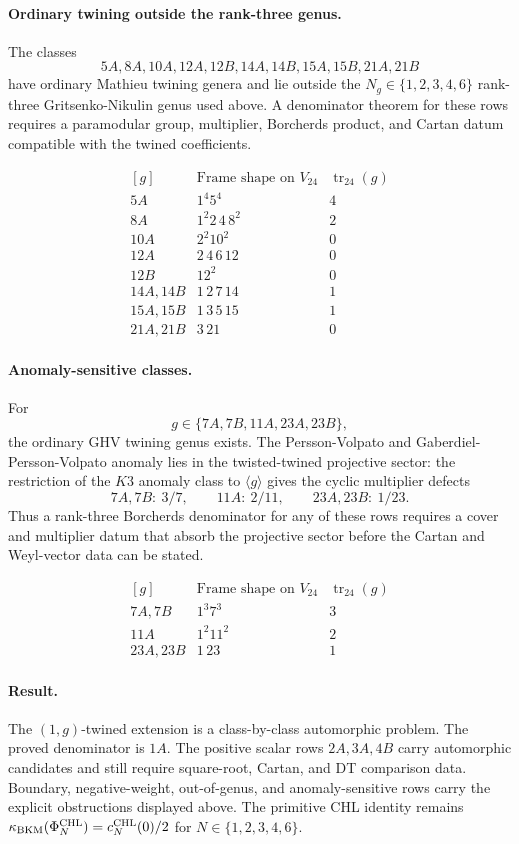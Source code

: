 \paragraph{Ordinary twining outside the rank-three genus.}
The classes
\[
  5A,8A,10A,12A,12B,14A,14B,15A,15B,21A,21B
\]
have ordinary Mathieu twining genera and lie outside the
\(N_g\in\{1,2,3,4,6\}\) rank-three Gritsenko-Nikulin genus used above.
A denominator theorem for these rows requires a paramodular group,
multiplier, Borcherds product, and Cartan datum compatible with the
twined coefficients.

\[
\begin{array}{c|c|c}
[g] & \text{Frame shape on }V_{24} & \operatorname{tr}_{24}(g)\\ \hline
5A & 1^4 5^4 & 4\\
8A & 1^2 2\,4\,8^2 & 2\\
10A & 2^2 10^2 & 0\\
12A & 2\,4\,6\,12 & 0\\
12B & 12^2 & 0\\
14A,14B & 1\,2\,7\,14 & 1\\
15A,15B & 1\,3\,5\,15 & 1\\
21A,21B & 3\,21 & 0
\end{array}
\]

\paragraph{Anomaly-sensitive classes.}
For
\[
  g\in\{7A,7B,11A,23A,23B\},
\]
the ordinary GHV twining genus exists.  The Persson-Volpato and
Gaberdiel-Persson-Volpato anomaly lies in the twisted-twined
projective sector: the restriction of the \(K3\) anomaly class to
\(\langle g\rangle\) gives the cyclic multiplier defects
\[
  7A,7B:\ 3/7,\qquad
  11A:\ 2/11,\qquad
  23A,23B:\ 1/23.
\]
Thus a rank-three Borcherds denominator for any of these rows requires
a cover and multiplier datum that absorb the projective sector before
the Cartan and Weyl-vector data can be stated.

\[
\begin{array}{c|c|c}
[g] & \text{Frame shape on }V_{24} & \operatorname{tr}_{24}(g)\\ \hline
7A,7B & 1^3 7^3 & 3\\
11A & 1^2 11^2 & 2\\
23A,23B & 1\,23 & 1
\end{array}
\]

\paragraph{Result.}
The \((1,g)\)-twined extension is a class-by-class automorphic problem.
The proved denominator is \(1A\).  The positive scalar rows \(2A,3A,4B\)
carry automorphic candidates and still require square-root, Cartan, and
DT comparison data.  Boundary, negative-weight, out-of-genus, and
anomaly-sensitive rows carry the explicit obstructions displayed above.
The primitive CHL identity remains
\(\kappa_{\mathrm{BKM}}(\Phi_{N}^{\mathrm{CHL}})=c^{\mathrm{CHL}}_N(0)/2\) for
\(N\in\{1,2,3,4,6\}\).

